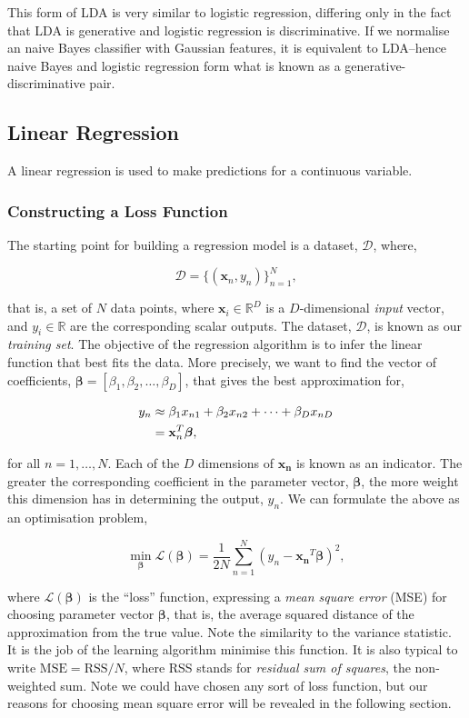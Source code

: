 \documentclass[11pt]{amsart}
\begin{document}
This form of LDA is very similar to logistic regression, differing only in the fact that LDA is generative and logistic regression is discriminative. If we normalise an naive Bayes classifier with Gaussian features, it is equivalent to LDA--hence naive Bayes and logistic regression form what is known as a generative-discriminative pair.

\subsection{Linear Regression}

A linear regression is used to make predictions for a continuous variable.

\subsubsection{Constructing a Loss Function}
The starting point for building a regression model is a dataset, $\mathcal{D}$, where,

$$\mathcal{D} = \{(\mathbf{x}_n, y_n)\}_{n=1}^{N},$$

that is, a set of $N$ data points, where $\mathbf{x}_i \in \mathbb{R}^D$ is a $D$-dimensional \emph{input} vector, and $y_i \in \mathbb{R}$ are the corresponding scalar outputs. The dataset, $\mathcal{D}$, is known as our \emph{training set}. The objective of the regression algorithm is to infer the linear function that best fits the data. More precisely, we want to find the vector of coefficients, $\boldsymbol\beta = [\beta_1, \beta_2, \dots, \beta_D]$, that gives the best approximation for,

\begin{align}
y_n &\approx \beta_1x_{n1} + \beta_2x_{n2} + \cdots + \beta_Dx_{nD} \notag \\
&= \mathbf{x}_n^T\boldsymbol\beta, \notag
\end{align}

for all $n = 1, \dots, N$. Each of the $D$ dimensions of $\mathbf{x_n}$ is known as an indicator. The greater the corresponding coefficient in the parameter vector, $\boldsymbol\beta$, the more weight this dimension has in determining the output, $y_n$. We can formulate the above as an optimisation problem,

$$\min_{\boldsymbol\beta}\mathcal{L}(\boldsymbol\beta) = \frac{1}{2N}\sum_{n=1}^{N}(y_n - \mathbf{x_n}^T\boldsymbol\beta)^2,$$

where $\mathcal{L}(\boldsymbol\beta)$ is the ``loss'' function, expressing a \emph{mean square error} (MSE) for choosing parameter vector $\boldsymbol\beta$, that is, the average squared distance of the approximation from the true value. Note the similarity to the variance statistic. It is the job of the learning algorithm minimise this function. It is also typical to write $\text{MSE} = \text{RSS}/N$, where RSS stands for \emph{residual sum of squares}, the non-weighted sum. Note we could have chosen any sort of loss function, but our reasons for choosing mean square error will be revealed in the following section.
\end{document}
